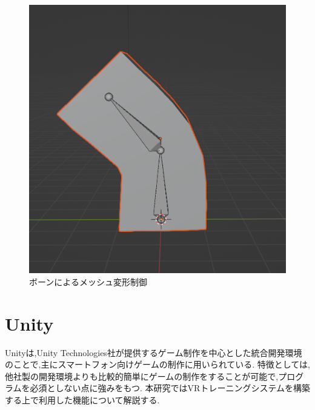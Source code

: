 \documentclass{ltjsreport}
\begin{document}
\begin{figure}[H]
\begin{minipage}{0.3\columnwidth}
			\includegraphics[width = \columnwidth]{../figs/bonecheck.png}
			\end{minipage}
			\caption{ボーンによるメッシュ変形制御}
			\label{fig:bonecontrol}
			\end{figure}
\vspace{-15pt}

	\section{Unity}
		Unityは,Unity Technologies社が提供するゲーム制作を中心とした統合開発環境のことで,主にスマートフォン向けゲームの制作に用いられている.
		特徴としては,他社製の開発環境よりも比較的簡単にゲームの制作をすることが可能で,プログラムを必須としない点に強みをもつ.
		本研究ではVRトレーニングシステムを構築する上で利用した機能について解説する.
\end{document}
